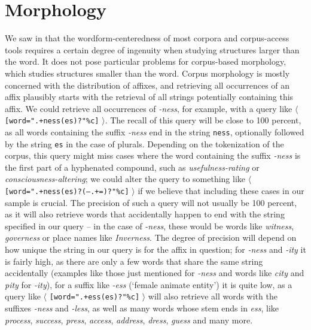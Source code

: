\chapter{Morphology}
\label{ch:morphology}

We saw in   that the wordform\hyp{}centeredness of most corpora and corpus\hyp{}access tools requires a certain degree of ingenuity when studying structures larger than the word. It does not pose particular problems for corpus\hyp{}based morphology,  which studies structures smaller than the word. Corpus morphology is mostly concerned with the distribution  of affixes,  and retrieving  all occurrences of an affix  plausibly starts with the retrieval of all strings potentially containing this affix.  We could retrieve all occurrences of \textit{-ness}, for example, with a query like $\langle$ \texttt{[word=".+ness(es)?"\%c]} $\rangle$. The recall  of this query will be close to 100 percent, as all words containing the suffix \textit{-ness} end in the string \texttt{ness}, optionally followed by the string \texttt{es} in the case of plurals.  Depending on the tokenization  of the corpus, this query might miss cases where the word containing the suffix \textit{-ness} is the first part of a hyphenated compound, such as \textit{usefulness-rating} or \textit{consciousness-altering}; we could alter the query to something like $\langle$ \texttt{[word=".+ness(es)?(--.+=)?"\%c]} $\rangle$ if we believe that including these cases in our sample is crucial. The precision  of such a query will not usually be 100 percent, as it will also retrieve words that accidentally happen to end with the string specified in our query -- in the case of \textit{-ness}, these would be words like \textit{witness}, \textit{governess} or place names like \textit{Inverness}. The degree of precision will depend on how unique the string in our query is for the affix  in question; for \textit{-ness} and \textit{-ity} it is fairly high, as there are only a few words that share the same string accidentally (examples like those just mentioned for \textit{-ness} and words like \textit{city} and \textit{pity} for \textit{-ity}), for a suffix  like \textit{-ess} (`female animate entity') it is quite low, as a query like $\langle$ \texttt{[word=".+ess(es)?"\%c]} $\rangle$ will also retrieve  all words with the suffixes  \textit{-ness} and \textit{-less}, as well as many words whose stem  ends in \textit{ess}, like \textit{process}, \textit{success}, \textit{press}, \textit{access}, \textit{address}, \textit{dress}, \textit{guess} and many more.


